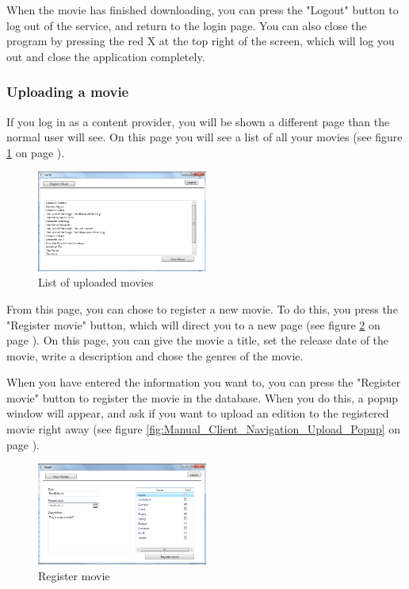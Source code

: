 When the movie has finished downloading, you can press the "Logout" button to log out of the service, and return to the login page. You can also close the program by pressing the red X at the top right of the screen, which will log you out and close the application completely.

\subsubsection{Uploading a movie}
\label{Manual_Client_Navigation_Upload}

If you log in as a content provider, you will be shown a different page than the normal user will see. On this page you will see a list of all your movies (see figure
\ref{fig:Manual_Client_Navigation_Upload_List} on page \pageref{fig:Manual_Client_Navigation_Upload_List}).

\begin{figure}[h!]  
  \centering
\includegraphics[width=0.5\textwidth]{Parts/Images/Manual/CPmovielist}
\caption{List of uploaded movies}
\label{fig:Manual_Client_Navigation_Upload_List}
\end{figure}
 
From this page, you can chose to register a new movie. To do this, you press the "Register movie" button, which will direct you to a new page (see figure \ref{fig:Manual_Client_Navigation_Upload_Register} on page \pageref{fig:Manual_Client_Navigation_Upload_Register}). On this page, you can give the movie a title, set the release date of the movie, write a description and chose the genres of the movie. 

When you have entered the information you want to, you can press the "Register movie" button to register the movie in the database. When you do this, a popup window will appear, and ask if you want to upload an edition to the registered movie right away (see figure \ref{fig:Manual_Client_Navigation_Upload_Popup} on page \pageref{fig:Manual_Client_Navigation_Upload_Popup}).

\begin{figure}[h!]  
  \centering
\includegraphics[width=0.5\textwidth]{Parts/Images/Manual/CPRegistermovie}
\caption{Register movie}
\label{fig:Manual_Client_Navigation_Upload_Register}
\end{figure}

